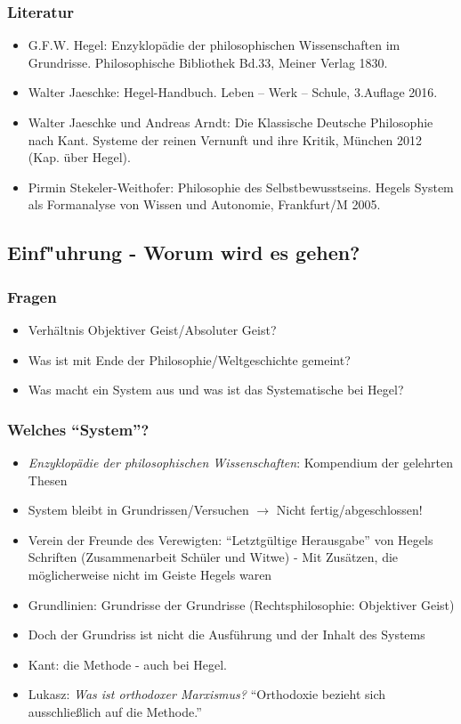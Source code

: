 \documentclass[emulatestandardclasses]{scrartcl}
\begin{document}
\subsubsection{Literatur}

\begin{itemize}
  \item G.F.W. Hegel: Enzyklopädie der philosophischen Wissenschaften im Grundrisse. Philosophische Bibliothek Bd.33, Meiner Verlag 1830.
  \item Walter Jaeschke: Hegel-Handbuch. Leben – Werk – Schule, 3.Auflage 2016.     
  \item Walter Jaeschke und Andreas Arndt: Die Klassische Deutsche Philosophie nach Kant. Systeme der reinen Vernunft und ihre Kritik, München 2012 (Kap. über Hegel).     
  \item Pirmin Stekeler-Weithofer: Philosophie des Selbstbewusstseins. Hegels System als Formanalyse von Wissen und Autonomie, Frankfurt/M 2005.
\end{itemize}


\subsection{Einf"uhrung - Worum wird es gehen?}

\subsubsection{Fragen}

\begin{itemize}
  \item Verhältnis Objektiver Geist/Absoluter Geist?
  \item Was ist mit Ende der Philosophie/Weltgeschichte gemeint?
  \item Was macht ein System aus und was ist das Systematische bei Hegel?
\end{itemize}

\subsubsection{Welches "`System"'?}

\begin{itemize}
  \item \emph{Enzyklopädie der philosophischen Wissenschaften}: Kompendium der gelehrten Thesen
  \item System bleibt in Grundrissen/Versuchen $\rightarrow$ Nicht fertig/abgeschlossen!
  \item Verein der Freunde des Verewigten: "`Letztgültige Herausgabe"' von Hegels Schriften (Zusammenarbeit Schüler und Witwe) - Mit Zusätzen, die möglicherweise nicht im Geiste Hegels waren
  \item Grundlinien: Grundrisse der Grundrisse (Rechtsphilosophie: Objektiver Geist)
  \item Doch der Grundriss ist nicht die Ausführung und der Inhalt des Systems
  \item Kant: die Methode - auch bei Hegel.
  \item Lukasz: \emph{Was ist orthodoxer Marxismus?} "`Orthodoxie bezieht sich ausschließlich auf die Methode."'
\end{itemize}
\end{document}
